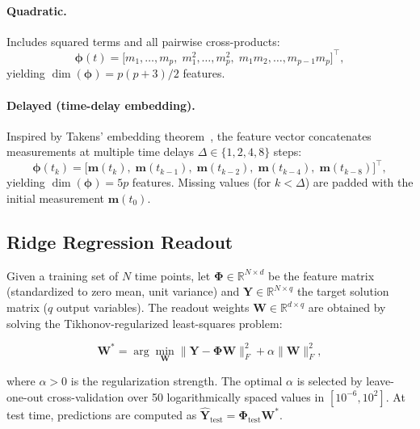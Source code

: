 \documentclass[11pt,twocolumn]{article}
\newcommand{\R}{\mathbb{R}}
\newcommand{\bphi}{\boldsymbol{\phi}}
\begin{document}
\paragraph{Quadratic.}
Includes squared terms and all pairwise cross-products:
\begin{equation}
  \bphi(t) = \bigl[m_1, \ldots, m_p,\; m_1^2, \ldots, m_p^2,\; m_1 m_2, \ldots, m_{p-1}m_p\bigr]^\top,
\end{equation}
yielding $\dim(\bphi) = p(p+3)/2$ features.

\paragraph{Delayed (time-delay embedding).}
Inspired by Takens' embedding theorem~\cite{takens1981detecting}, the
feature vector concatenates measurements at multiple time delays
$\Delta \in \{1, 2, 4, 8\}$ steps:
\begin{equation}
  \bphi(t_k) = \bigl[\mathbf{m}(t_k),\; \mathbf{m}(t_{k-1}),\;
    \mathbf{m}(t_{k-2}),\; \mathbf{m}(t_{k-4}),\; \mathbf{m}(t_{k-8})\bigr]^\top,
  \label{eq:delayed}
\end{equation}
yielding $\dim(\bphi) = 5p$ features.  Missing values (for $k < \Delta$) are
padded with the initial measurement $\mathbf{m}(t_0)$.

\subsection{Ridge Regression Readout}
\label{sec:readout}

Given a training set of $N$ time points, let
$\boldsymbol{\Phi} \in \R^{N \times d}$ be the feature matrix (standardized
to zero mean, unit variance) and
$\mathbf{Y} \in \R^{N \times q}$ the target solution matrix ($q$ output
variables).  The readout weights $\mathbf{W} \in \R^{d \times q}$ are
obtained by solving the Tikhonov-regularized least-squares problem:

\begin{equation}
  \mathbf{W}^* = \arg\min_{\mathbf{W}} \bigl\|\mathbf{Y} - \boldsymbol{\Phi}\mathbf{W}\bigr\|_F^2 + \alpha\|\mathbf{W}\|_F^2,
  \label{eq:ridge}
\end{equation}

where $\alpha > 0$ is the regularization strength.  The optimal $\alpha$ is
selected by leave-one-out cross-validation over 50 logarithmically spaced
values in $[10^{-6}, 10^2]$.  At test time, predictions are computed as
$\hat{\mathbf{Y}}_\text{test} = \boldsymbol{\Phi}_\text{test}\mathbf{W}^*$.
\end{document}
